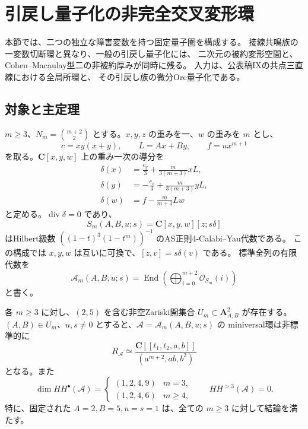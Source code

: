 \section{引戻し量子化の非完全交叉変形環}
\label{sec:pullback-fixed-hulls-v37}

本節では、二つの独立な障害変数を持つ固定量子圏を構成する。
接線共鳴族の一変数切断環と異なり、一般の引戻し量子化には、
二次元の被約変形空間と、Cohen--Macaulay型二の非被約厚みが同時に残る。
入力は、公表稿IX\cite{VKPoisson34}の共点三直線における全局所環と、
その引戻し族の微分Ore量子化である。

\subsection{対象と主定理}

$m\ge3$、$N_m=\binom{m+2}{2}$ とする。$x,y,z$ の重みを一、$w$ の重みを $m$ とし、
\[
 c=xy(x+y),\qquad L=Ax+By,\qquad f=u x^{m+1}
\]
を取る。$\mathbf C[x,y,w]$ 上の重み一次の導分を
\begin{align*}
 \delta(x)&=\frac{c_y}{3}+\frac{m}{3(m+3)}xL,\\
 \delta(y)&=-\frac{c_x}{3}+\frac{m}{3(m+3)}yL,\\
 \delta(w)&=f-\frac{m}{m+3}Lw
\end{align*}
と定める。$\operatorname{div}\delta=0$ であり、
\[
 S_m(A,B,u;s)=\mathbf C[x,y,w][z;s\delta]
\]
はHilbert級数 $((1-t)^3(1-t^m))^{-1}$ のAS正則4-Calabi--Yau代数である。
この構成では $x,y,w$ は互いに可換で、$[z,v]=s\delta(v)$ である。
標準全列の有限代数を
\[
 \mathcal A_m(A,B,u;s)
 =\operatorname{End}\left(\bigoplus_{i=0}^{m+2}\mathcal O_{S_m}(i)\right)
\]
と書く。

\begin{theorem}[二変数の非完全交叉厚みを持つ固定量子圏]
\label{thm:pullback-fixed-hull-v37}
各 $m\ge3$ に対し、$(2,5)$ を含む非空Zariski開集合
$U_m\subset\mathbf A^2_{A,B}$ が存在する。
$(A,B)\in U_m$、$u,s\ne0$ とすると、$\mathcal A=\mathcal A_m(A,B,u;s)$ の
miniversal環は非標準的に
\[
 \boxed{R_{\mathcal A}\simeq
 \frac{\mathbf C[[t_1,t_2,a,b]]}{(a^{m+2},ab,b^2)}}
\]
となる。また
\[
 \dim HH^\bullet(\mathcal A)=
 \begin{cases}
 (1,2,4,9)&m=3,\\
 (1,2,4,6)&m\ge4,
 \end{cases}
 \qquad HH^{>3}(\mathcal A)=0.
\]
特に、固定された $A=2,B=5,u=s=1$ は、全ての $m\ge3$ に対して結論を満たす。
\end{theorem}

